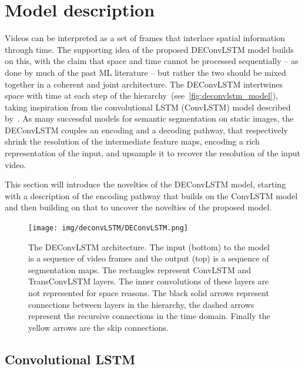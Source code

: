 

\section{Model description}\label{sec:deconvlstm_model}

Videos can be interpreted as a set of frames that interlace spatial information
through time. The supporting idea of the proposed DEConvLSTM model builds on
this, with the claim that space and time cannot be processed sequentially -- as
done by much of the past ML literature -- but rather the two should be mixed
together in a coherent and joint architecture. The DEConvLSTM intertwines space
with time at each step of the hierarchy~(see~\autoref{fig:deconvlstm_model}),
taking inspiration from the convolutional LSTM (ConvLSTM) model described
by~\citep{ShiCWYWW15}.
As many successful models for semantic segmentation on static images, the
DEConvLSTM couples an encoding and a decoding pathway, that respectively shrink
the resolution of the intermediate feature maps, encoding a rich representation
of the input, and upsample it to recover the resolution of the input video.

This section will introduce the novelties of the DEConvLSTM model, starting
with a description of the encoding pathway that builds on the ConvLSTM model
and then building on that to uncover the novelties of the proposed model.

\begin{figure}[t]
    \centering
    \texttt{[image: img/deconvLSTM/DEConvLSTM.png]}
    \caption{The DEConvLSTM architecture. The input (bottom) to the model is a
        sequence of video frames and the output (top) is a sequence of
        segmentation maps. The rectangles represent ConvLSTM and TransConvLSTM
        layers. The inner convolutions of these layers are not represented for
        space reasons. The black solid arrows represent connections between
        layers in the hierarchy, the dashed arrows represent the recursive
        connections in the time domain. Finally the yellow arrows are the skip
        connections.}\label{fig:deconvlstm_model}
\end{figure}


\subsection{Convolutional LSTM}

